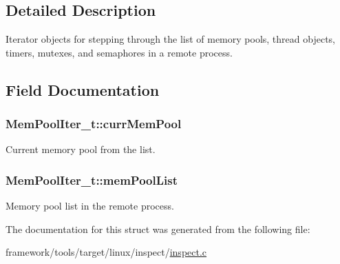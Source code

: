 \subsection{Detailed Description}
Iterator objects for stepping through the list of memory pools, thread objects, timers, mutexes, and semaphores in a remote process. 

\subsection{Field Documentation}
\subsubsection[{\texorpdfstring{curr\+Mem\+Pool}{currMemPool}}]{ Mem\+Pool\+Iter\+\_\+t\+::curr\+Mem\+Pool}\hypertarget{struct_mem_pool_iter__t_a8c2dcace3eddd0b79f679e7033a63f78}{}\label{struct_mem_pool_iter__t_a8c2dcace3eddd0b79f679e7033a63f78}


Current memory pool from the list. 

\subsubsection[{\texorpdfstring{mem\+Pool\+List}{memPoolList}}]{ Mem\+Pool\+Iter\+\_\+t\+::mem\+Pool\+List}\hypertarget{struct_mem_pool_iter__t_abc276e0a6f52d6f27628c8d5a5a5268b}{}\label{struct_mem_pool_iter__t_abc276e0a6f52d6f27628c8d5a5a5268b}


Memory pool list in the remote process. 



The documentation for this struct was generated from the following file\+:\begin{DoxyCompactItemize}
\item 
framework/tools/target/linux/inspect/\hyperlink{inspect_8c}{inspect.\+c}\end{DoxyCompactItemize}
